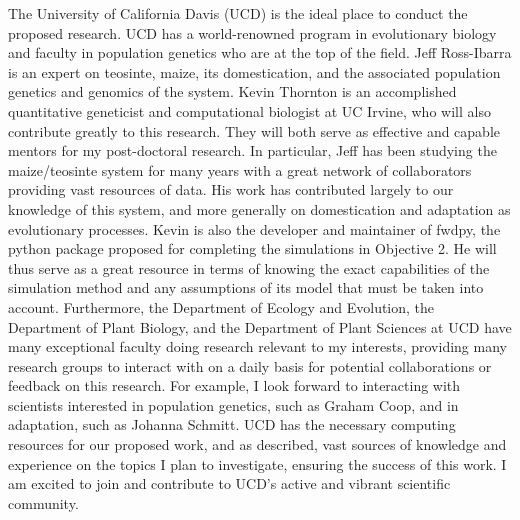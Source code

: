 The University of California Davis (UCD) is the ideal place to conduct the proposed research. UCD has a world-renowned program in evolutionary biology and faculty in population genetics who are at the top of the field. Jeff Ross\--Ibarra is an expert on teosinte, maize, its domestication, and the associated population genetics and genomics of the system.  
Kevin Thornton is an accomplished quantitative geneticist and computational biologist at UC Irvine, who will also contribute greatly to this research. 
They will both serve as effective and capable mentors for my post-doctoral research. In particular, Jeff has been studying the maize\//teosinte system for many %
years with a great network of collaborators providing vast resources of data. His work has contributed largely to our knowledge of this system, and more generally on domestication and adaptation as evolutionary processes. Kevin is also the developer and maintainer of fwdpy, the python package proposed for completing the simulations in Objective 2. He will thus serve as a great resource in terms of knowing the exact capabilities of the simulation method and any assumptions of its model that must be taken into account.
Furthermore, the Department of Ecology and Evolution, the Department of Plant Biology, and the Department of Plant Sciences at UCD have many exceptional faculty doing research relevant to my interests, providing many research groups to interact with on a daily basis for potential collaborations or feedback on this research. For example, I look forward to interacting with scientists interested in population genetics, such as Graham Coop, and in adaptation, such as Johanna Schmitt. %
UCD has the necessary computing resources for our proposed work, and as described, vast sources of knowledge and experience on the topics I plan to investigate, ensuring the success of this work. I am excited to join and contribute to UCD's active and vibrant scientific community. 


